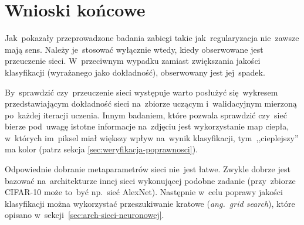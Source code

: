 \section{Wnioski końcowe}
Jak~pokazały przeprowadzone badania zabiegi takie jak~regularyzacja nie~zawsze mają sens. Należy je~stosować wyłącznie
wtedy, kiedy obserwowane jest przeuczenie sieci. W~przeciwnym wypadku zamiast zwiększania jakości klasyfikacji
(wyrażanego jako dokładność), obserwowany jest jej~spadek.

By~sprawdzić czy~przeuczenie sieci występuje warto posłużyć się~wykresem przedstawiającym dokładność sieci na~zbiorze
uczącym i~walidacyjnym mierzoną po~każdej iteracji uczenia. Innym badaniem, które pozwala sprawdzić czy~sieć bierze
pod~uwagę istotne informacje na~zdjęciu jest wykorzystanie map ciepła, w~których im~piksel miał większy wpływ
na~wynik klasyfikacji, tym~,,cieplejszy'' ma kolor (patrz sekcja \ref{sec:weryfikacja-poprawnosci}).

Odpowiednie dobranie metaparametrów sieci nie~jest łatwe. Zwykle dobrze jest bazować na~architekturze innej sieci
wykonującej podobne zadanie (przy~zbiorze \mbox{CIFAR-10} może to~być np.~sieć AlexNet). Następnie w~celu poprawy jakości
klasyfikacji można wykorzystać przeszukiwanie kratowe (\textit{ang.~grid search}), które opisano
w~sekcji~\ref{sec:arch-sieci-neuronowej}.
